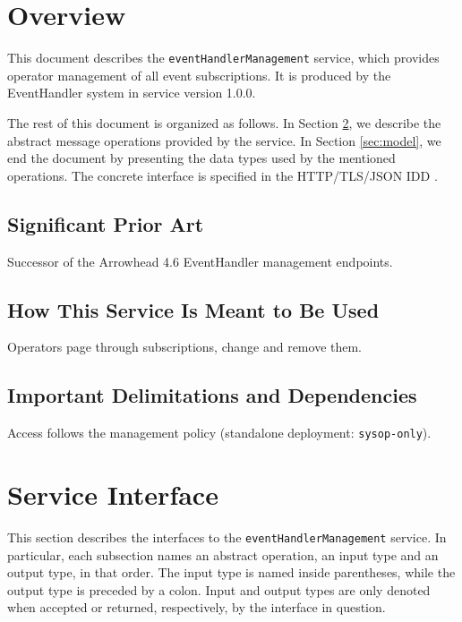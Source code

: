 \documentclass[a4paper]{arrowhead}
\begin{document}
\section{Overview}
\label{sec:overview}

This document describes the \texttt{event\allowbreak{}Handler\allowbreak{}Management} service, which provides operator management of all event subscriptions.
It is produced by the EventHandler system \cite{eh-sysd} in service version 1.0.0.

The rest of this document is organized as follows.
In Section \ref{sec:operations}, we describe the abstract message operations provided by the service.
In Section \ref{sec:model}, we end the document by presenting the data types used by the mentioned operations.
The concrete interface is specified in the HTTP/TLS/JSON IDD \cite{eh-eventHandlerManagement-http-idd}.

\subsection{Significant Prior Art}

Successor of the Arrowhead 4.6 EventHandler management endpoints.

\subsection{How This Service Is Meant to Be Used}

Operators page through subscriptions, change and remove them.

\subsection{Important Delimitations and Dependencies}
\label{sec:delimitations}

Access follows the management policy (standalone deployment: \texttt{sysop-\allowbreak{}only}).

\newpage

\section{Service Interface}
\label{sec:operations}

This section describes the interfaces to the \texttt{event\allowbreak{}Handler\allowbreak{}Management} service.
In particular, each subsection names an abstract operation, an input type and an output type, in that order.
The input type is named inside parentheses, while the output type is preceded by a colon.
Input and output types are only denoted when accepted or returned, respectively, by the interface in question.
\end{document}
